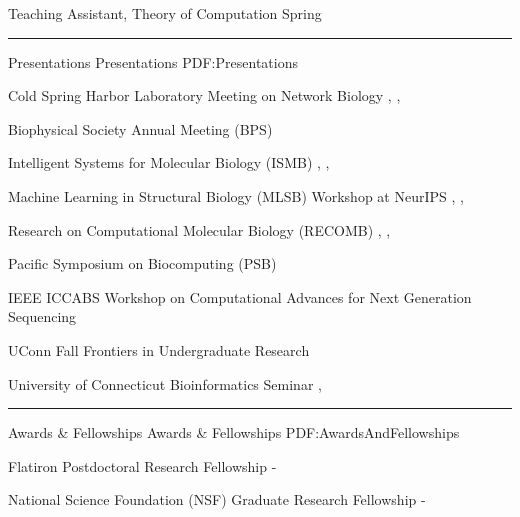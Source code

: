 \documentclass[letterpaper,MMMyyyy,nonstopmode]{simpleresumecv}
\begin{document}
\begin{Body}
\Gap
\Item Teaching Assistant, Theory of Computation
\hfill
Spring 


\BigGap
\hrule
\Section
{Presentations}
{Presentations}
{PDF:Presentations}

\Entry
{Cold Spring Harbor Laboratory Meeting on Network Biology}
\hfill
{}, , 
\Gap

\Entry
{Biophysical Society Annual Meeting (BPS)}
\hfill
{}
\Gap

\Entry
{Intelligent Systems for Molecular Biology (ISMB)}
\hfill
{}, , 
\Gap

\Entry
{Machine Learning in Structural Biology (MLSB) Workshop at NeurIPS}
\hfill
{}, , 
\Gap

\Entry
{Research on Computational Molecular Biology (RECOMB)}
\hfill
{}, , 
\Gap

\Entry
{Pacific Symposium on Biocomputing (PSB)}
\hfill
{}
\Gap

\Entry
{IEEE ICCABS Workshop on Computational Advances for Next Generation Sequencing}
\hfill
{}
\Gap

\Entry
{UConn Fall Frontiers in Undergraduate Research}
\hfill
{}
\Gap

\Entry
{University of Connecticut Bioinformatics Seminar}
\hfill
{}, 

\BigGap
\hrule
\Section
{Awards \&\newline
Fellowships}
{Awards \& Fellowships}
{PDF:AwardsAndFellowships}

\Entry
{Flatiron Postdoctoral Research Fellowship}
\hfill
{} - 
\Gap

\Entry
{National Science Foundation (NSF) Graduate Research Fellowship}
\hfill
{} - 
\Gap


\end{Body}
\end{document}
